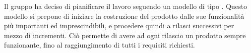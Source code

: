 Il gruppo \Gruppo{} ha deciso di pianificare il lavoro seguendo un modello di tipo \textbf {}. Questo modello si prepone di iniziare la costruzione del prodotto dalle sue funzionalità più importanti ed imprescindibili, e procedere quindi a rilasci successivi per mezzo di incrementi. Ciò permette di avere ad ogni rilascio un prodotto sempre funzionante, fino al raggiungimento di tutti i requisiti richiesti.